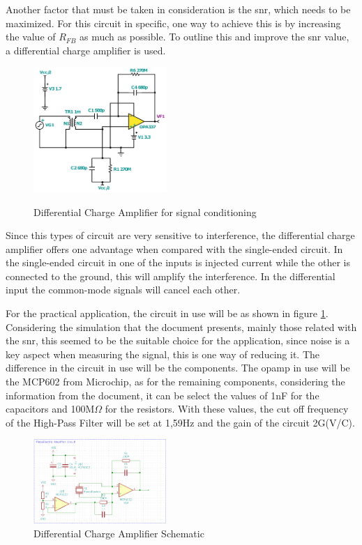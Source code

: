 Another factor that must be taken in consideration is the \acrshort{snr}, which needs to be maximized. For this circuit in specific, one way to achieve this is by increasing the value of $R_{FB}$ as much as possible. To outline this and improve the \acrshort{snr} value, a differential charge amplifier is used.

\begin{figure}[]
    \centering
    \includegraphics[width=0.45\textwidth]{Chapters/4CHP/Figures/differentialchargeamp.pdf}
    \caption{Differential Charge Amplifier for signal conditioning}{\cite{bartolomeSignalConditioningPiezoelectric2010}}
    \label{fig:ChargeAmpDif}
\end{figure}

Since this types of circuit are very sensitive to interference, the differential charge amplifier offers one advantage when compared with the single-ended circuit. In the single-ended circuit in one of the inputs is injected current while the other is connected to the ground, this will amplify the interference. In the differential input the common-mode signals will cancel each other.

For the practical application, the  circuit in use will be as shown in figure \ref{fig:ChargeAmpDif}. Considering the simulation that the document \cite{bartolomeSignalConditioningPiezoelectric2010} presents, mainly those related with the \acrshort{snr}, this seemed to be the suitable choice for the application, since noise is a key aspect when measuring the signal, this is one way of reducing it. The difference in the circuit in use will be the components. The \acrshort{opamp} in use will be the MCP602 from Microchip, as for the remaining components, considering the information from the document, it can be select the values of 1nF for the capacitors and 100M$\Omega$ for the resistors. With these values, the cut off frequency of the High-Pass Filter will be set at 1,59Hz and the gain of the circuit 2G(V/C).
\begin{figure}[]
    \centering
    \includegraphics[width=0.45\textwidth]{Chapters/4CHP/Figures/piezoAmpcirc.PNG}
    \caption{Differential Charge Amplifier Schematic}
    \label{fig:ChargeAmpDifSCH}
\end{figure}

